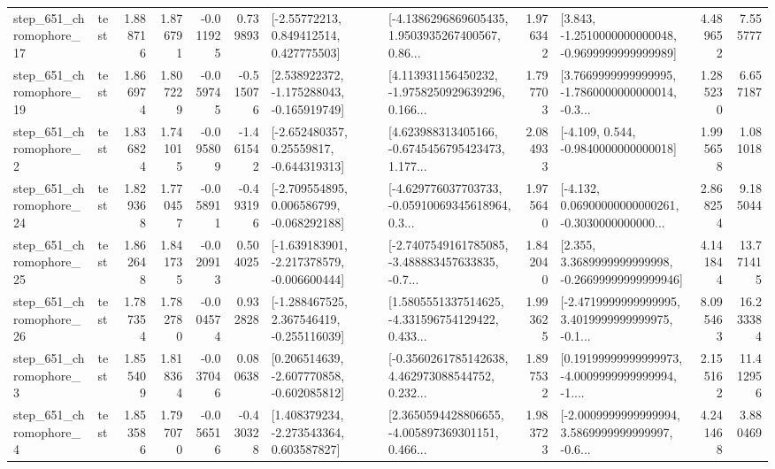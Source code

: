 \begin{tabular}{llrrrrllrlrr}
  step\_651\_chromophore\_17 &      test &      1.888716 &    1.876791 &     -0.011925 &  0.739893 &     [-2.55772213, 0.849412514, 0.427775503] &  [-4.1386296869605435, 1.9503935267400567, 0.86... &       1.976342 &  [3.843, -1.2510000000000048, -0.9699999999999989] &            4.489652 &          7.555777 \\
  step\_651\_chromophore\_19 &      test &      1.866974 &    1.807229 &     -0.059745 & -0.515076 &   [2.538922372, -1.175288043, -0.165919749] &  [4.113931156450232, -1.9758250929639296, 0.166... &       1.797703 &  [3.7669999999999995, -1.7860000000000014, -0.3... &            1.285230 &          6.657187 \\
   step\_651\_chromophore\_2 &      test &      1.836824 &    1.741015 &     -0.095809 & -1.461542 &    [-2.652480357, 0.25559817, -0.644319313] &  [4.623988313405166, -0.6745456795423473, 1.177... &       2.084933 &               [-4.109, 0.544, -0.9840000000000018] &            1.995658 &          1.081018 \\
  step\_651\_chromophore\_24 &      test &      1.829368 &    1.770457 &     -0.058911 & -0.493196 &   [-2.709554895, 0.006586799, -0.068292188] &  [-4.629776037703733, -0.05910069345618964, 0.3... &       1.975640 &  [-4.132, 0.06900000000000261, -0.3030000000000... &            2.868254 &          9.185044 \\
  step\_651\_chromophore\_25 &      test &      1.862648 &    1.841735 &     -0.020913 &  0.504025 &  [-1.639183901, -2.217378579, -0.006600444] &  [-2.7407549161785085, -3.488883457633835, -0.7... &       1.842040 &  [2.355, 3.3689999999999998, -0.26699999999999946] &            4.141844 &         13.771415 \\
  step\_651\_chromophore\_26 &      test &      1.787354 &    1.782780 &     -0.004574 &  0.932828 &   [-1.288467525, 2.367546419, -0.255116039] &  [1.5805551337514625, -4.331596754129422, 0.433... &       1.993625 &  [-2.4719999999999995, 3.4019999999999975, -0.1... &            8.095463 &         16.233384 \\
   step\_651\_chromophore\_3 &      test &      1.855409 &    1.818364 &     -0.037046 &  0.080638 &   [0.206514639, -2.607770858, -0.602085812] &  [-0.3560261785142638, 4.462973088544752, 0.232... &       1.897532 &  [0.19199999999999973, -4.0009999999999994, -1.... &            2.155162 &         11.412956 \\
   step\_651\_chromophore\_4 &      test &      1.853586 &    1.797070 &     -0.056516 & -0.430328 &    [1.408379234, -2.273543364, 0.603587827] &  [2.3650594428806655, -4.005897369301151, 0.466... &       1.983723 &  [-2.0009999999999994, 3.5869999999999997, -0.6... &            4.241468 &          3.880469 \\

\end{tabular}
